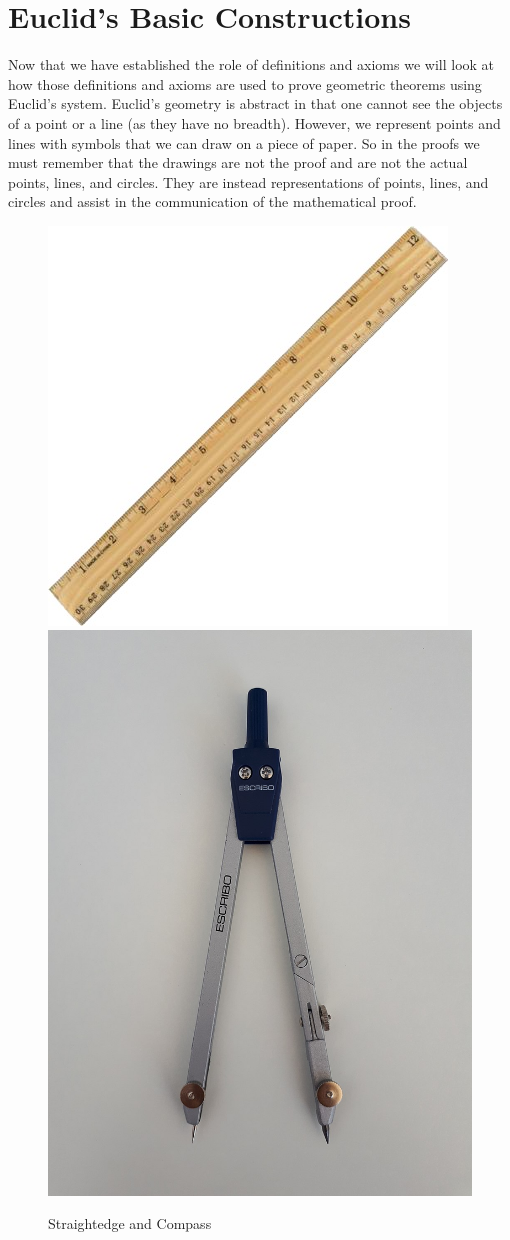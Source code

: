\documentclass[
]{book}
\let\stdsection\section
\renewcommand\section{\newpage\stdsection}
\theoremstyle{definition}
\theoremstyle{definition}
\theoremstyle{definition}
\theoremstyle{definition}
\theoremstyle{remark}
\begin{document}
\hypertarget{euclids-basic-constructions}{%
\section{Euclid's Basic Constructions}\label{euclids-basic-constructions}}

Now that we have established the role of definitions and axioms we will look at how those definitions and axioms are used to prove geometric theorems using Euclid's system. Euclid's geometry is abstract in that one cannot see the objects of a point or a line (as they have no breadth). However, we represent points and lines with symbols that we can draw on a piece of paper. So in the proofs we must remember that the drawings are not the proof and are not the actual points, lines, and circles. They are instead representations of points, lines, and circles and assist in the communication of the mathematical proof.

\begin{figure}

{\centering \includegraphics[width=0.48\linewidth]{images/Ruler} \includegraphics[width=0.48\linewidth]{images/Compass} 

}

\caption{Straightedge and Compass}\label{fig:Straightedge-Compass}
\end{figure}
\end{document}
